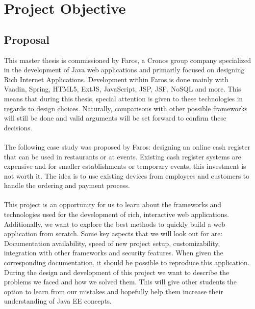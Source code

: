 \documentclass[12pt]{article}
\begin{document}
\section{Project Objective}
\begin{multicols}{2}
\subsection{Proposal}
This master thesis is commissioned by Faros, a Cronos group company specialized in the development of Java web applications and primarily focused on designing Rich Internet Applications. Development within Faros is done mainly with Vaadin, Spring, HTML5, ExtJS, JavaScript, JSP, JSF, NoSQL and more.\cite{farosProposal} This means that during this thesis, special attention is given to these technologies in regards to design choices. Naturally, comparisons with other possible frameworks will still be done and valid arguments will be set forward to confirm these decisions.
\\\\
The following case study was proposed by Faros: designing an online cash register that can be used in restaurants or at events. Existing cash register systems are expensive and for smaller establishments or temporary events, this investment is not worth it. The idea is to use existing devices from employees and customers to handle the ordering and payment process.
\\\\
This project is an opportunity for us to learn about the frameworks and technologies used for the development of rich, interactive web applications. Additionally, we want to explore the best methods to quickly build a web application from scratch. Some key aspects that we will look out for are: Documentation availability, speed of new project setup, customizability, integration with other frameworks and security features. When given the corresponding documentation, it should be possible to reproduce this application. During the design and development of this project we want to describe the problems we faced and how we solved them. This will give other students the option to learn from our mistakes and hopefully help them increase their understanding of Java EE concepts. 


\end{multicols}
\end{document}
